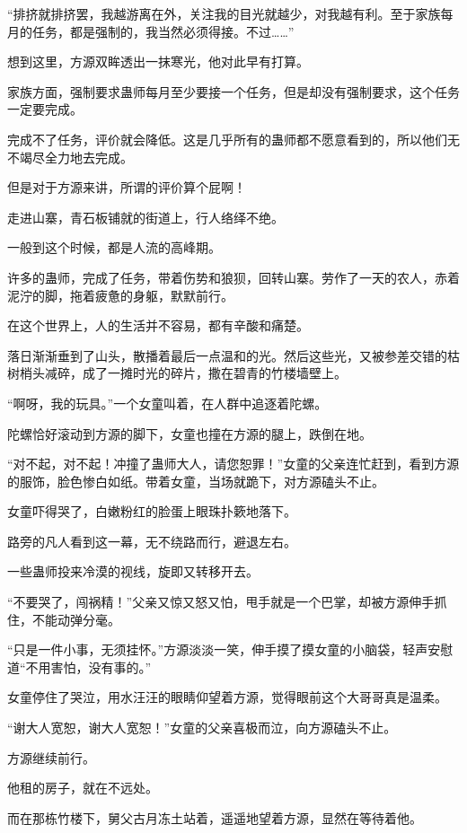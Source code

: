 \begin{this_body}
“排挤就排挤罢，我越游离在外，关注我的目光就越少，对我越有利。至于家族每月的任务，都是强制的，我当然必须得接。不过……”

想到这里，方源双眸透出一抹寒光，他对此早有打算。

家族方面，强制要求蛊师每月至少要接一个任务，但是却没有强制要求，这个任务一定要完成。

完成不了任务，评价就会降低。这是几乎所有的蛊师都不愿意看到的，所以他们无不竭尽全力地去完成。

但是对于方源来讲，所谓的评价算个屁啊！

走进山寨，青石板铺就的街道上，行人络绎不绝。

一般到这个时候，都是人流的高峰期。

许多的蛊师，完成了任务，带着伤势和狼狈，回转山寨。劳作了一天的农人，赤着泥泞的脚，拖着疲惫的身躯，默默前行。

在这个世界上，人的生活并不容易，都有辛酸和痛楚。

落日渐渐垂到了山头，散播着最后一点温和的光。然后这些光，又被参差交错的枯树梢头减碎，成了一摊时光的碎片，撒在碧青的竹楼墙壁上。

“啊呀，我的玩具。”一个女童叫着，在人群中追逐着陀螺。

陀螺恰好滚动到方源的脚下，女童也撞在方源的腿上，跌倒在地。

“对不起，对不起！冲撞了蛊师大人，请您恕罪！”女童的父亲连忙赶到，看到方源的服饰，脸色惨白如纸。带着女童，当场就跪下，对方源磕头不止。

女童吓得哭了，白嫩粉红的脸蛋上眼珠扑簌地落下。

路旁的凡人看到这一幕，无不绕路而行，避退左右。

一些蛊师投来冷漠的视线，旋即又转移开去。

“不要哭了，闯祸精！”父亲又惊又怒又怕，甩手就是一个巴掌，却被方源伸手抓住，不能动弹分毫。

“只是一件小事，无须挂怀。”方源淡淡一笑，伸手摸了摸女童的小脑袋，轻声安慰道“不用害怕，没有事的。”

女童停住了哭泣，用水汪汪的眼睛仰望着方源，觉得眼前这个大哥哥真是温柔。

“谢大人宽恕，谢大人宽恕！”女童的父亲喜极而泣，向方源磕头不止。

方源继续前行。

他租的房子，就在不远处。

而在那栋竹楼下，舅父古月冻土站着，遥遥地望着方源，显然在等待着他。

\end{this_body}

